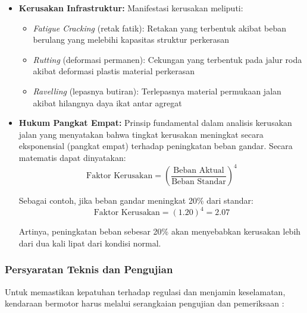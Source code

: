 \begin{itemize}[nolistsep]
  \item \textbf{Kerusakan Infrastruktur:} Manifestasi kerusakan meliputi:
  \begin{itemize}[nolistsep]
    \item \emph{Fatigue Cracking} (retak fatik): Retakan yang terbentuk akibat beban berulang yang melebihi kapasitas struktur perkerasan
    \item \emph{Rutting} (deformasi permanen): Cekungan yang terbentuk pada jalur roda akibat deformasi plastis material perkerasan
    \item \emph{Ravelling} (lepasnya butiran): Terlepasnya material permukaan jalan akibat hilangnya daya ikat antar agregat
  \end{itemize}
  
  \item \textbf{Hukum Pangkat Empat:} Prinsip fundamental dalam analisis kerusakan jalan yang menyatakan bahwa tingkat kerusakan meningkat secara eksponensial (pangkat empat) terhadap peningkatan beban gandar. Secara matematis dapat dinyatakan:
  \begin{equation}
    \mbox{Faktor Kerusakan} = \left(\frac{\mbox{Beban Aktual}}{\mbox{Beban Standar}}\right)^4
  \end{equation}
  
  Sebagai contoh, jika beban gandar meningkat 20\% dari standar:
  \begin{equation}
    \mbox{Faktor Kerusakan} = (1.20)^4 = 2.07
  \end{equation}
  
  Artinya, peningkatan beban sebesar 20\% akan menyebabkan kerusakan lebih dari dua kali lipat dari kondisi normal.
\end{itemize}

\subsubsection{Persyaratan Teknis dan Pengujian}
Untuk memastikan kepatuhan terhadap regulasi dan menjamin keselamatan, kendaraan bermotor harus melalui serangkaian pengujian dan pemeriksaan \parencite*{ditjenhubdat2021}:

